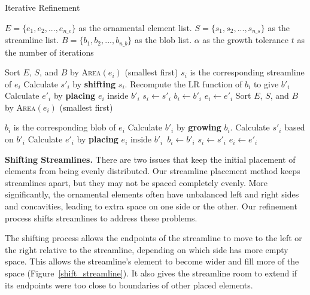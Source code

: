 \begin{algorithm}[h!] 
\caption{Iterative Refinement} 
\label{iterative_refinement_algorithm}
\begin{algorithmic} 
\REQUIRE $E = \{ e_{1}, e_{2},... , e_{n\text{\_}e} \}$ as the ornamental element list. 
\REQUIRE $S = \{ s_{1}, s_{2},... , s_{n\text{\_}s} \}$ as the streamline list.
\REQUIRE $B = \{ b_{1}, b_{2},... , b_{n\text{\_}b} \}$ as the blob list.
\REQUIRE $\alpha$ as the growth tolerance
\REQUIRE $t$ as the number of iterations

  \STATE Sort $E$, $S$, and $B$ by \textsc{Area}$(e_{i})$ (smallest first)
  	\STATE $s_{i}$ is the corresponding streamline of $e_{i}$
    \STATE Calculate $s'_{i}$ by \textbf{shifting} $s_{i}$.
    \STATE Recompute the LR function of $b_{i}$ to give $b'_{i}$
    \STATE Calculate $e'_{i}$ by \textbf{placing} $e_{i}$ inside $b'_{i}$
        \STATE $s_{i} \leftarrow s'_{i}$
        \STATE $b_{i} \leftarrow b'_{i}$
    	\STATE $e_{i} \leftarrow e'_{i}$ 
    \ENDIF
  \ENDFOR
  \STATE Sort $E$, $S$, and $B$ by \textsc{Area}$(e_{i})$ (smallest first)

  	\STATE $b_{i}$ is the corresponding blob of $e_{i}$
    \STATE Calculate $b'_{i}$ by \textbf{growing} $b_{i}$.
    \STATE Calculate $s'_{i}$ based on $b'_{i}$ 
    \STATE Calculate $e'_{i}$ by \textbf{placing} $e_{i}$ inside $b'_{i}$\
    \STATE $b_{i} \leftarrow b'_{i}$
        \STATE $s_{i} \leftarrow s'_{i}$
    	\STATE $e_{i} \leftarrow e'_{i}$ 
    \ENDIF
  \ENDFOR

\ENDFOR
\end{algorithmic}
\end{algorithm}

\textbf{Shifting Streamlines.}
There are two issues that keep the initial placement of elements from being
evenly
distributed. Our streamline placement method keeps streamlines apart,
but they may not be spaced completely evenly. More significantly, the
ornamental elements often have unbalanced left and right sides and concavities,
leading to extra space on one side or the other.  Our refinement process
shifts streamlines to address these problems.

The shifting process allows the endpoints of the streamline to move to the
left or the right relative to the streamline, depending on which side has more empty space.
This allows the streamline's element to become wider and fill more of the space
(Figure~\ref{shift_streamline}). It also gives the streamline room to
extend if its endpoints were too close to boundaries of other placed
elements.

